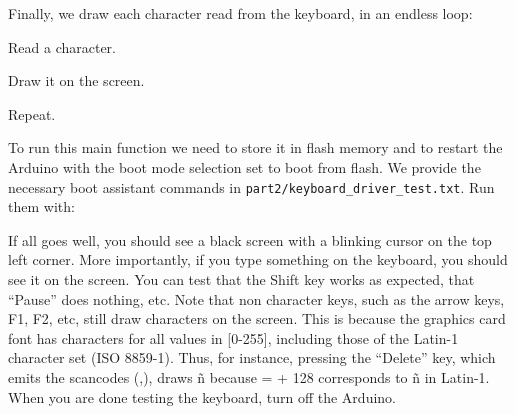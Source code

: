 \begin{TwoColumns}
\end{TwoColumns}

Finally, we draw each character read from the keyboard, in an
endless loop:

\begin{Paragraph}
\begin{paracol}{2}
Read a character.


Draw it on the screen.


Repeat.

\end{paracol}
\end{Paragraph}

To run this main function we need to store it in flash memory and to restart
the Arduino with the boot mode selection set to boot from flash. We provide the
necessary boot assistant commands in {\tt part2/keyboard\_driver\_test.txt}.
Run them with:


If all goes well, you should see a black screen with a blinking cursor on the
top left corner. More importantly, if you type something on the keyboard, you
should see it on the screen. You can test that the Shift key works as expected,
that ``Pause'' does nothing, etc. Note that non character keys, such as the
arrow keys, F1, F2, etc, still draw characters on the screen. This is because
the graphics card font has characters for all values in [0-255], including
those of the Latin-1 character set (ISO 8859-1). Thus, for instance, pressing
the ``Delete'' key, which emits the scancodes (,), draws
\~{n} because  =  + 128 corresponds to \~{n} in Latin-1. When
you are done testing the keyboard, turn off the Arduino.

